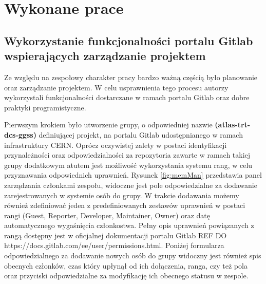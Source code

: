 
\chapter{Wykonane prace}
\label{cha:prace}

\section{Wykorzystanie funkcjonalności portalu Gitlab wspierających zarządzanie projektem}

Ze względu na zespołowy charakter pracy bardzo ważną częścią było planowanie oraz zarządzanie projektem. W celu usprawnienia tego procesu autorzy wykorzystali funkcjonalności dostarczane w ramach portalu Gitlab oraz dobre praktyki programistyczne. \par

Pierwszym krokiem było utworzenie grupy, o odpowiedniej nazwie \textbf{(atlas-trt-dcs-ggss)} definiującej projekt, na portalu Gitlab udostępnianego w ramach infrastruktury CERN. Oprócz oczywistej zalety w postaci identyfikacji przynależności oraz odpowiedzialności za repozytoria zawarte w ramach takiej grupy dodatkowym atutem jest możliwość wykorzystania systemu rang, w celu przyznawania odpowiednich uprawnień. Rysunek \ref{fig:memMan} przedstawia panel zarządzania członkami zespołu, widoczne jest pole odpowiedzialne za dodawanie zarejestrowanych w systemie osób do grupy. W trakcie dodawania możemy również zdefiniować jeden z predefiniowanych zestawów uprawnień w postaci rangi (Guest, Reporter, Developer, Maintainer, Owner) oraz datę automatycznego wygaśnięcia członkostwa. Pełny opis uprawnień powiązanych z rangą dostępny jest w oficjalnej dokumentacji portalu Gitlab REF DO https://docs.gitlab.com/ee/user/permissions.html. Poniżej formularza odpowiedzialnego za dodawanie nowych osób do grupy widoczny jest również spis obecnych członków, czas który upłynął od ich dołączenia, ranga, czy też pola oraz przyciski odpowiedzialne za modyfikację ich obecnego statusu w zespole.

